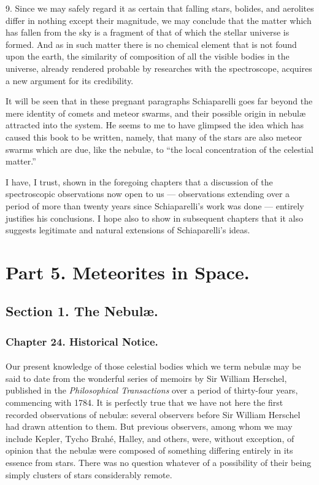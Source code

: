\documentclass[a4paper, 12pt, oneside, polutonikogreek, english]{article}
\begin{document}
9. Since we may safely regard it as certain that falling stars, bolides, and aerolites differ in nothing except their magnitude, we may conclude that the matter which has fallen from the sky is a fragment of that of which the stellar universe is formed. And as in such matter there is no chemical element that is not found upon the earth, the similarity of composition of all the visible bodies in the universe, already rendered probable by researches with the spectroscope, acquires a new argument for its credibility.

It will be seen that in these pregnant paragraphs Schiaparelli goes far beyond the mere identity of comets and meteor swarms, and their possible origin in nebulæ attracted into the system. He seems to me to have glimpsed the idea which has caused this book to be written, namely, that many of the stars are also meteor swarms which are due, like the nebulæ, to ``the local concentration of the celestial matter.''

I have, I trust, shown in the foregoing chapters that a discussion of the spectroscopic observations now open to us --- observations extending over a period of more than twenty years since Schiaparelli's work was done --- entirely justifies his conclusions. I hope also to show in subsequent chapters that it also suggests legitimate and natural extensions of Schiaparelli's ideas.
\clearpage
\section{Part 5. Meteorites in Space.}
\subsection{Section 1. The Nebulæ.}
\subsubsection{Chapter 24. Historical Notice.}
\paragraph{}
Our present knowledge of those celestial bodies which we term nebulæ may be said to date from the wonderful series of memoirs by Sir William Herschel, published in the \emph{Philosophical Transactions} over a period of thirty-four years, commencing with 1784. It is perfectly true that we have not here the first recorded observations of nebulæ: several observers before Sir William Herschel had drawn attention to them. But previous observers, among whom we may include Kepler, Tycho Brahé, Halley, and others, were, without exception, of opinion that the nebulæ were composed of something differing entirely in its essence from stars. There was no question whatever of a possibility of their being simply clusters of stars considerably remote.
\end{document}
